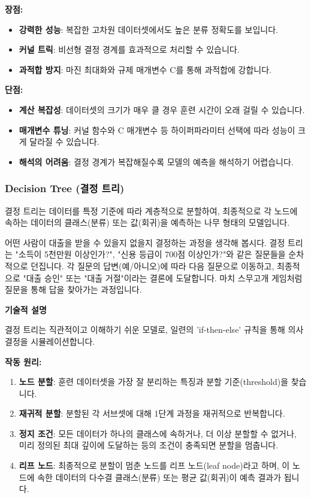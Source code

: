 \documentclass[11pt,a4paper]{article}
\theoremstyle{definition}
\begin{document}
\textbf{장점:}
\begin{itemize}
    \item \textbf{강력한 성능}: 복잡한 고차원 데이터셋에서도 높은 분류 정확도를 보입니다.
    \item \textbf{커널 트릭}: 비선형 결정 경계를 효과적으로 처리할 수 있습니다.
    \item \textbf{과적합 방지}: 마진 최대화와 규제 매개변수 C를 통해 과적합에 강합니다.
\end{itemize}

\textbf{단점:}
\begin{itemize}
    \item \textbf{계산 복잡성}: 데이터셋의 크기가 매우 클 경우 훈련 시간이 오래 걸릴 수 있습니다.
    \item \textbf{매개변수 튜닝}: 커널 함수와 C 매개변수 등 하이퍼파라미터 선택에 따라 성능이 크게 달라질 수 있습니다.
    \item \textbf{해석의 어려움}: 결정 경계가 복잡해질수록 모델의 예측을 해석하기 어렵습니다.
\end{itemize}

\subsubsection{Decision Tree (결정 트리)}

\begin{summarybox}[title={한 줄 핵심 요약}]
결정 트리는 데이터를 특정 기준에 따라 계층적으로 분할하여, 최종적으로 각 노드에 속하는 데이터의 클래스(분류) 또는 값(회귀)을 예측하는 나무 형태의 모델입니다.
\end{summarybox}

\begin{examplebox}[title={직관적 예시/비유}]
어떤 사람이 대출을 받을 수 있을지 없을지 결정하는 과정을 생각해 봅시다. 결정 트리는 "소득이 5천만원 이상인가?", "신용 등급이 700점 이상인가?"와 같은 질문들을 순차적으로 던집니다. 각 질문의 답변(예/아니오)에 따라 다음 질문으로 이동하고, 최종적으로 "대출 승인" 또는 "대출 거절"이라는 결론에 도달합니다. 마치 스무고개 게임처럼 질문을 통해 답을 찾아가는 과정입니다.
\end{examplebox}

\textbf{기술적 설명}

결정 트리는 직관적이고 이해하기 쉬운 모델로, 일련의 'if-then-else' 규칙을 통해 의사결정을 시뮬레이션합니다.

\textbf{작동 원리:}
\begin{enumerate}
    \item \textbf{노드 분할}: 훈련 데이터셋을 가장 잘 분리하는 특징과 분할 기준(threshold)을 찾습니다.
    \item \textbf{재귀적 분할}: 분할된 각 서브셋에 대해 1단계 과정을 재귀적으로 반복합니다.
    \item \textbf{정지 조건}: 모든 데이터가 하나의 클래스에 속하거나, 더 이상 분할할 수 없거나, 미리 정의된 최대 깊이에 도달하는 등의 조건이 충족되면 분할을 멈춥니다.
    \item \textbf{리프 노드}: 최종적으로 분할이 멈춘 노드를 리프 노드(leaf node)라고 하며, 이 노드에 속한 데이터의 다수결 클래스(분류) 또는 평균 값(회귀)이 예측 결과가 됩니다.
\end{enumerate}
\end{document}
